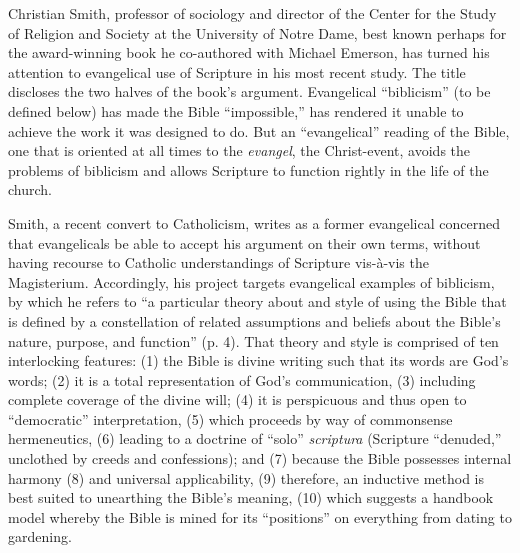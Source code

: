 

\def\bookby{Christian Smith}
\def\booktitle{The Bible Made Impossible: Why Biblicism is Not a Truly Evangelical Reading of Scripture}
\def\shorttitle{The Bible Made Impossible}
\def\bookpublication{Grand Rapids, Michigan: Brazos Press, 2011. Pp. xiv + 220. Hardcover. \$22.99.}
\def\keywords{evangelicalism, Catholicism, hermeneutics}
\def\reviewauthor{Wesley A. Hill}
\def\institution{Durham University, UK}
\def\datesubmitted{30 July 2011}
\def\dateaccepted{25 October 2011}
\def\datepublished{26 October 2011}
\def\jstyear{2011}
\def\jstvol{1}
\def\jstiss{1}
\def\firstpage{501}
\def\lastpage{504}

\noindent Christian Smith, professor of sociology and director of the Center for the Study of Religion and Society at the University of Notre Dame, best known perhaps for the award-winning book he co-authored with Michael Emerson,  has turned his attention to evangelical use of Scripture in his most recent study. The title discloses the two halves of the book’s argument. Evangelical “biblicism” (to be defined below) has made the Bible “impossible,” has rendered it unable to achieve the work it was designed to do. But an “evangelical” reading of the Bible, one that is oriented at all times to the \emph{evangel}, the Christ-event, avoids the problems of biblicism and allows Scripture to function rightly in the life of the church.

Smith, a recent convert to Catholicism, writes as a former evangelical concerned that evangelicals be able to accept his argument on their own terms, without having recourse to Catholic understandings of Scripture vis-à-vis the Magisterium. Accordingly, his project targets evangelical examples of biblicism, by which he refers to “a particular theory about and style of using the Bible that is defined by a constellation of related assumptions and beliefs about the Bible’s nature, purpose, and function” (p. 4). That theory and style is comprised of ten interlocking features: (1) the Bible is divine writing such that its words are God’s words; (2) it is a total representation of God’s communication, (3) including complete coverage of the divine will; (4) it is perspicuous and thus open to “democratic” interpretation, (5) which proceeds by way of commonsense hermeneutics, (6) leading to a doctrine of “solo” \emph{scriptura} (Scripture “denuded,” unclothed by creeds and confessions); and (7) because the Bible possesses internal harmony (8) and universal applicability, (9) therefore, an inductive method is best suited to unearthing the Bible’s meaning, (10) which suggests a handbook model whereby the Bible is mined for its “positions” on everything from dating to gardening.

